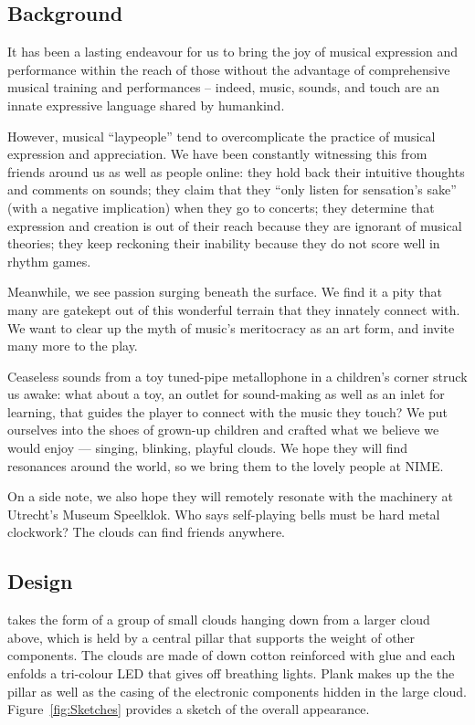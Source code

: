 \documentclass{nimemusic}
\begin{document}
\subsection{Background}
It has been a lasting endeavour for us to bring the joy of musical expression and performance within the reach of those without the advantage of comprehensive musical training and performances -- indeed, music, sounds, and touch are an innate expressive language shared by humankind.

However, musical ``laypeople'' tend to overcomplicate the practice of musical expression and appreciation. We have been constantly witnessing this from friends around us as well as people online: they hold back their intuitive thoughts and comments on sounds; they claim that they ``only listen for sensation's sake'' (with a negative implication) when they go to concerts; they determine that expression and creation is out of their reach because they are ignorant of musical theories; they keep reckoning their inability because they do not score well in rhythm games.

Meanwhile, we see passion surging beneath the surface. We find it a pity that many are gatekept out of this wonderful terrain that they innately connect with. We want to clear up the myth of music's meritocracy as an art form, and invite many more to the play.

Ceaseless sounds from a toy tuned-pipe metallophone in a children's corner struck us awake: what about a toy, an outlet for sound-making as well as an inlet for learning, that guides the player to connect with the music they touch? We put ourselves into the shoes of grown-up children and crafted what we believe we would enjoy --- singing, blinking, playful clouds. We hope they will find resonances around the world, so we bring them to the lovely people at NIME.

On a side note, we also hope they will remotely resonate with the machinery at Utrecht's Museum Speelklok. Who says self-playing bells must be hard metal clockwork? The clouds can find friends anywhere.

\subsection{Design}
\CuHum{} takes the form of a group of small clouds hanging down from a larger cloud above, which is held by a central pillar that supports the weight of other components. The clouds are made of down cotton reinforced with glue and each enfolds a tri-colour LED that gives off breathing lights. Plank makes up the the pillar as well as the casing of the electronic components hidden in the large cloud. Figure~\ref{fig:Sketches} provides a sketch of the overall appearance.
\end{document}

